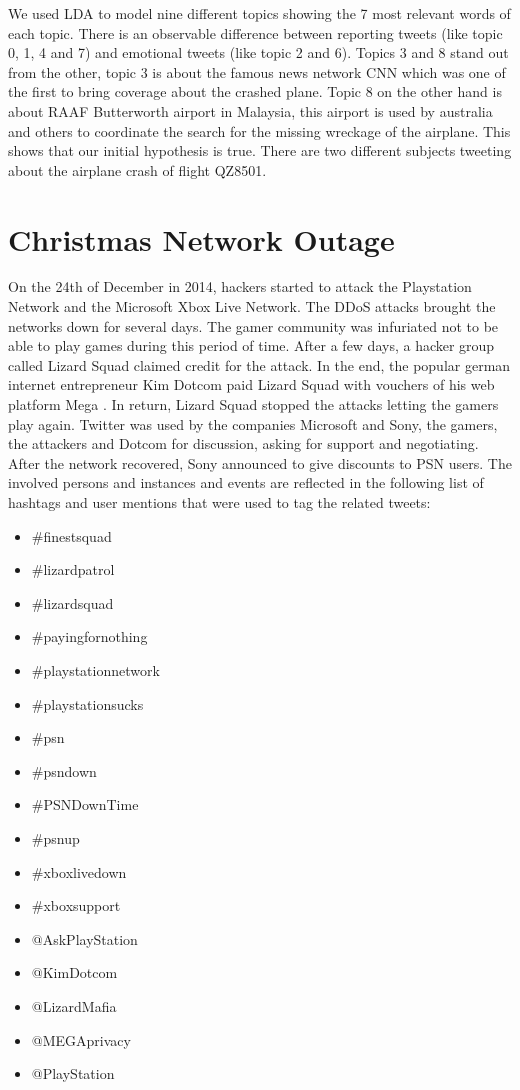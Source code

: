We used LDA to model nine different topics showing the 7 most relevant words of each topic. There is an observable difference between reporting tweets (like topic 0, 1, 4 and 7) and emotional tweets (like topic 2 and 6). Topics 3 and 8 stand out from the other, topic 3 is about the famous news network CNN which was one of the first to bring coverage about the crashed plane. Topic 8 on the other hand is about RAAF Butterworth airport in Malaysia, this airport is used by australia and others to coordinate the search for the missing wreckage of the airplane.
This shows that our initial hypothesis is true. There are two different subjects tweeting about the airplane crash of flight QZ8501.


\section{Christmas Network Outage}
\label{sec:christmas-network-outage}
On the 24th of December in 2014, hackers started to attack the Playstation Network and the Microsoft Xbox Live Network. The DDoS attacks brought the networks down for several days. The gamer community was infuriated not to be able to play games during this period of time.\cite{wool2014sony}
After a few days, a hacker group called Lizard Squad claimed credit for the attack.
In the end, the popular german internet entrepreneur Kim Dotcom paid Lizard Squad with vouchers of his web platform Mega \cite{Dotcom2014}. In return, Lizard Squad stopped the attacks letting the gamers play again. Twitter was used by the companies Microsoft and Sony, the gamers, the attackers and Dotcom for discussion, asking for support and negotiating. After the network recovered, Sony announced to give discounts to PSN users. The involved persons and instances and events are reflected in the following list of hashtags and user mentions that were used to tag the related tweets:

\begin{multicols}{3}
\begin{itemize}[label={}]
	\item \#finestsquad
	\item \#lizardpatrol
    \item \#lizardsquad
    \item \#payingfornothing
    \item \#playstationnetwork
    \item \#playstationsucks
    \item \#psn
    \item \#psndown
    \item \#PSNDownTime
    \item \#psnup
    \item \#xboxlivedown
    \item \#xboxsupport
    \item @AskPlayStation
    \item @KimDotcom
    \item @LizardMafia
    \item @MEGAprivacy
    \item @PlayStation
\end{itemize}
\end{multicols}


